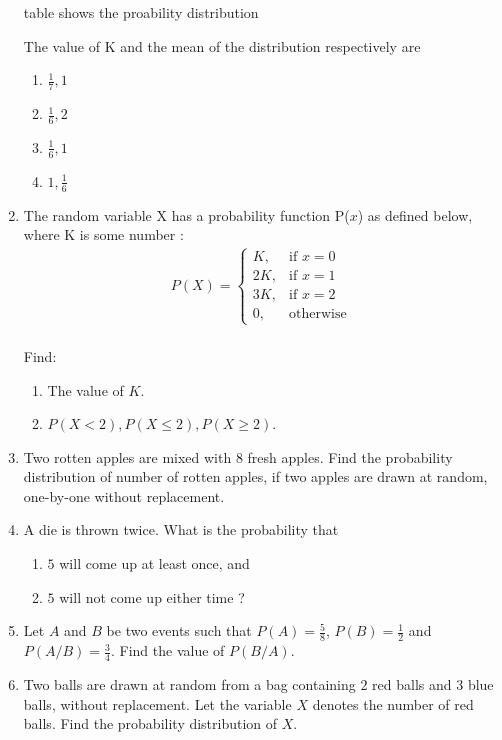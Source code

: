 \begin{enumerate}[label=\thesection.\arabic*.,ref=\thesection.\theenumi]
\begin{table}[!ht]
\caption{table shows the proability distribution \label{tab:probability distribution}}
\end{table}
\newline The value of K and the mean of the distribution respectively are 
\begin{enumerate}
\item $\frac{1}{7}, 1$
\item $\frac{1}{6}, 2$
\item $\frac{1}{6}, 1$
\item $1, \frac{1}{6}$
\end{enumerate}
\item The random variable X has a probability function P($x$) as defined below, where K is some number :
\\ \begin{align}P(X)=\begin{cases} K, & \text{if }  x=0 \\ 2K, & \text{if } x=1\\ 3K, & \text{if } x=2\\ 0, & \text{otherwise  } \end{cases}\end{align}
\\ Find:
\begin{enumerate}
\item The value of $K$.
\item $P(X<2),P(X \le 2), P(X \ge 2)$.
\end{enumerate}
\item Two rotten apples are mixed with 8 fresh apples. Find the probability distribution of number of rotten apples, if two apples are drawn at  random, one-by-one without replacement.

\item A die is thrown twice. What is the probability that 
\begin{enumerate}[label=(\roman*)]
 \item $5$ will come up at least once, and 
 \item $5$ will not come up either time ? 
\end{enumerate}

\item Let $A$ and $B$ be two events such that $P(A)=\frac{5}{8}$, $P(B)=\frac{1}{2}$ and $P(A/B)=\frac{3}{4}$. Find the value of $P(B/A)$.

\item Two balls are drawn at random from a bag containing $2$ red balls and $3$ blue balls, without replacement. Let the variable $X$ denotes the number of red balls. Find the probability distribution of $X$.


\end{enumerate}
